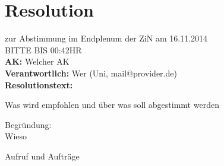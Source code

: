 \section{Resolution}
zur Abstimmung im Endplenum der ZiN am 16.11.2014 \\
BITTE BIS 00:42HR \\
\textbf{AK:} Welcher AK \\
\textbf{Verantwortlich:} Wer (Uni, mail@provider.de)\\ 
\textbf{Resolutionstext:} 

Was wird empfohlen und \"uber was soll abgestimmt werden

Begründung: \\
Wieso

Aufruf und Auftr\"age